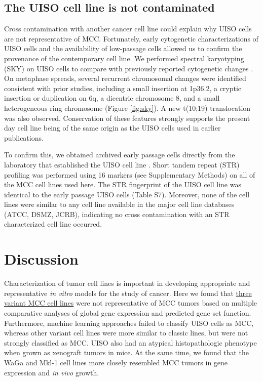 \documentclass[10pt]{article}
\begin{document}
\subsection*{The UISO cell line is not contaminated}
Cross contamination with another cancer cell line could explain why UISO cells are not representative of MCC.
Fortunately, early cytogenetic characterizations of UISO cells and the availability of low-passage cells allowed us to confirm the provenance of the contemporary cell line.
We performed spectral karyotyping (SKY) on UISO cells to compare with previously reported cytogenetic changes \citep{VanGele2002Combined,VanGele1998Characteristic}.
On metaphase spreads, several recurrent chromosomal changes were identified consistent with prior studies, including a small insertion at 1p36.2, a cryptic insertion or duplication on 6q, a dicentric chromosome 8, and a small heterogeneous ring chromosome (Figure \ref{fig:sky}).
A new t(10;19) translocation was also observed.
Conservation of these features strongly supports the present day cell line being of the same origin as the UISO cells used in earlier publications.

To confirm this, we obtained archived early passage cells directly from the laboratory that established the UISO cell line \citep{Ronan1993Merkel}.
Short tandem repeat (STR) profiling \citep{Masters2001Short} was performed using 16 markers (see Supplementary Methods) on all of the MCC cell lines used here.
The STR fingerprint of the UISO cell line was identical to the early passage UISO cells (Table S7).
Moreover,  none of the cell lines were similar to any cell line available in the major cell line databases (ATCC, DSMZ, JCRB), indicating no cross contamination with an STR characterized cell line occurred.

\section*{Discussion}

Characterization of tumor cell lines is important in developing appropriate and representative \emph{in vitro} models for the study of cancer.
Here we found that \uline{three variant MCC cell lines} were not representative of MCC tumors based on multiple comparative analyses of global gene expression and predicted gene set function.
Furthermore, machine learning approaches failed to classify UISO cells as MCC, whereas other variant cell lines were more similar to classic lines, but were not strongly classified as MCC.
UISO also had an atypical histopathologic phenotype when grown as xenograft tumors in mice.
At the same time, we found that the WaGa and Mkl-1 cell lines more closely resembled MCC tumors in gene expression and \emph{in vivo} growth.
\end{document}
